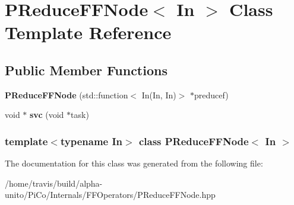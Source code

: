 \hypertarget{class_p_reduce_f_f_node}{\section{\-P\-Reduce\-F\-F\-Node$<$ \-In $>$ \-Class \-Template \-Reference}
\label{class_p_reduce_f_f_node}
}
\subsection*{\-Public \-Member \-Functions}
\begin{DoxyCompactItemize}
\item 
\hypertarget{class_p_reduce_f_f_node_a618f505f2a8eb4c8af71229016508356}{{\bfseries \-P\-Reduce\-F\-F\-Node} (std\-::function$<$ \-In(\-In, \-In)$>$ $\ast$preducef)}\label{class_p_reduce_f_f_node_a618f505f2a8eb4c8af71229016508356}

\item 
\hypertarget{class_p_reduce_f_f_node_a6f425a4f78632b76cec0e7658bcf8c3b}{void $\ast$ {\bfseries svc} (void $\ast$task)}\label{class_p_reduce_f_f_node_a6f425a4f78632b76cec0e7658bcf8c3b}

\end{DoxyCompactItemize}
\subsubsection*{template$<$typename In$>$ class P\-Reduce\-F\-F\-Node$<$ In $>$}



\-The documentation for this class was generated from the following file\-:\begin{DoxyCompactItemize}
\item 
/home/travis/build/alpha-\/unito/\-Pi\-Co/\-Internals/\-F\-F\-Operators/\-P\-Reduce\-F\-F\-Node.\-hpp\end{DoxyCompactItemize}
